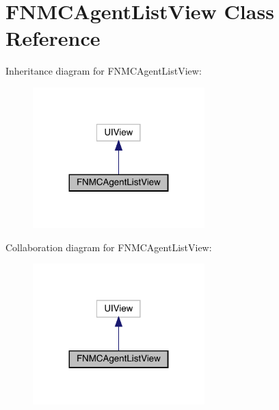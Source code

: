 \hypertarget{interface_f_n_m_c_agent_list_view}{}\section{F\+N\+M\+C\+Agent\+List\+View Class Reference}
\label{interface_f_n_m_c_agent_list_view}


Inheritance diagram for F\+N\+M\+C\+Agent\+List\+View\+:\nopagebreak
\begin{figure}[H]
\begin{center}
\leavevmode
\includegraphics[width=188pt]{interface_f_n_m_c_agent_list_view__inherit__graph}
\end{center}
\end{figure}


Collaboration diagram for F\+N\+M\+C\+Agent\+List\+View\+:\nopagebreak
\begin{figure}[H]
\begin{center}
\leavevmode
\includegraphics[width=188pt]{interface_f_n_m_c_agent_list_view__coll__graph}
\end{center}
\end{figure}
